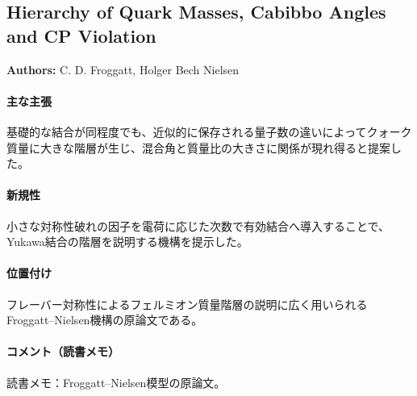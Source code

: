 \subsection{Hierarchy of Quark Masses, Cabibbo Angles and CP Violation}

\textbf{Authors:} C. D. Froggatt, Holger Bech Nielsen

\paragraph{主な主張}
基礎的な結合が同程度でも、近似的に保存される量子数の違いによってクォーク質量に大きな階層が生じ、混合角と質量比の大きさに関係が現れ得ると提案した\cite{Froggatt:1978nt}。

\paragraph{新規性}
小さな対称性破れの因子を電荷に応じた次数で有効結合へ導入することで、Yukawa結合の階層を説明する機構を提示した。

\paragraph{位置付け}
フレーバー対称性によるフェルミオン質量階層の説明に広く用いられるFroggatt--Nielsen機構の原論文である。

\paragraph{コメント（読書メモ）}
読書メモ：Froggatt--Nielsen模型の原論文。
